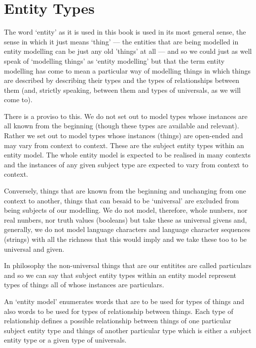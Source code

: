 
\section{Entity Types}

\mynote The word `entity' as it is used in this book is used in its most general sense,  the sense in which it just means `thing' --- the entities that are being modelled in entity modelling can be just any old 'things' at all --- and so we could just as well speak of `modelling things' as `entity modelling' but that the term entity modelling
has come to mean a particular way of modelling things in which things are described by describing their types and the types of relationships between them (and, strictly speaking, between them and types of universals, as we will come to).

\mynote There is a proviso to this. We do not set out to model types whose instances are all known from the beginning (though these types are available and relevant). Rather we set out to model types whose instances (things) are open-ended and may vary from context to context. These are the subject entity types within an entity model. The whole entity model is expected to be realised in many contexts and the instances of any given subject type are expected to vary from context to context.
 
\mynote
Conversely, things that are known from the beginning and unchanging from one context to another, things that can besaid to be `universal' are excluded from being subjects of our modelling. We do not model, therefore, whole nunbers, nor real nunbers, nor truth values (booleans) but take these as universal givens and, generally, we do not model language characters and language character sequences (strings) with all the richness that this would imply and we take these too to be universal and given. 

\mynote
In philosophy the non-universal things that are our entitites are called particulars and so we can say that subject entity types within an entity model represent types of things all of whose instances are particulars. 

\mynote An `entity model' enumerates words that are to be used for types of things and also words to be used for types of relationship between things. Each type of relationship defines a possible relationship between things of one particular subject entity type and things of another particular type which is either a subject entity type or a given type of universals.  

